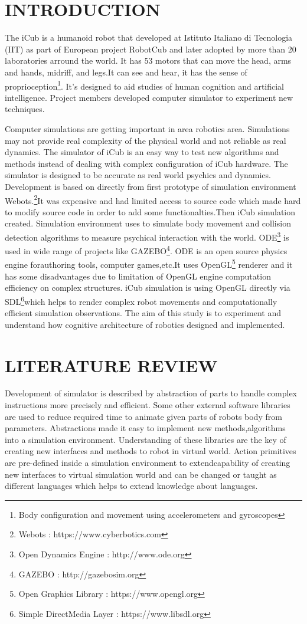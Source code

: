 \documentclass[a4paper, 11pt]{report}
\begin{document}
\chapter{INTRODUCTION}
The iCub is a humanoid robot that developed at Istituto Italiano di 
Tecnologia (IIT) as part of European project RobotCub and later adopted by 
more 
than 20 laboratories arround the world. It has 53 motors that can move the 
head, arms and hands, midriff, and legs.It can see and hear, it has the sense 
of proprioception\footnote{Body configuration and movement using accelerometers 
and gyroscopes}. It’s designed to aid studies of human cognition and artificial 
intelligence. Project members developed computer simulator to experiment new 
techniques.\par 
Computer simulations are getting important in area robotics area. Simulations 
may not provide real complexity of the physical world and 
not reliable as real dynamics. The simulator of iCub is an easy way to test 
new algorithms and methods instead of dealing with complex configuration of 
iCub hardware. The simulator is designed to be accurate as real world 
psychics and dynamics. Development is based on directly from first prototype 
of simulation environment Webots.\footnote{Webots : 
  https://www.cyberbotics.com}It was 
expensive and had limited access to source code which made hard to modify 
source code in order to add some functionalties.Then iCub simulation created. 
Simulation environment uses \linebreak to simulate body 
movement and collision detection algorithms to measure psychical interaction 
with the world. ODE\footnote{Open Dynamics Engine : http://www.ode.org} is 
used in wide range of projects like GAZEBO\footnote{GAZEBO : 
  http://gazebosim.org}. ODE is an open source physics engine forauthoring 
  tools, 
computer games,etc.It uses OpenGL\footnote{Open Graphics Library : 
  https://www.opengl.org} renderer and it has some disadvantages due to 
limitation of OpenGL engine computation efficiency on complex structures. 
iCub 
simulation is using OpenGL directly via SDL\footnote{Simple DirectMedia Layer 
: 
  https://www.libsdl.org}which helps to render complex robot movements and 
computationally efficient simulation observations. The aim of this study is to 
experiment and understand how cognitive architecture of robotics designed and 
implemented. 

\chapter{LITERATURE REVIEW}
Development of simulator is described by abstraction of parts to handle 
complex instructions more precisely and efficient. Some other external 
software 
libraries are used to reduce required time to animate given parts of robots 
body from parameters. Abstractions made it easy to implement new 
methods,algorithms into a simulation environment. Understanding of these 
libraries are the key of creating new interfaces and methods to robot in 
virtual world. Action primitives are pre-defined inside a simulation 
environment to extendcapability of creating new interfaces to virtual 
simulation world and can be changed or taught as different languages which 
helps to extend knowledge about languages.
\end{document}
